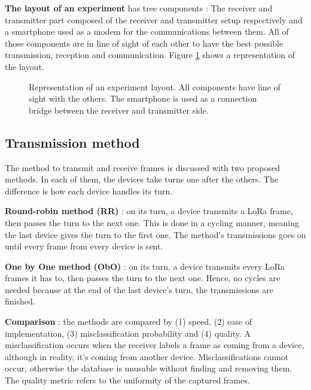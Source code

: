 \documentclass[a4paper, 12pt]{article}
\begin{document}
\textbf{The layout of an experiment} has tree components :
The receiver and transmitter part composed of the receiver and transmitter setup respectively and a smartphone used as a modem for the communications between them.
All of those components are in line of sight of each other to have the best possible transmission, reception and communication.
Figure \ref{fig:layout} shows a representation of the layout.


\begin{figure}[H]
  \begin{center}
    
  \end{center}
  \caption{Representation of an experiment layout. All components have line of sight with the others. The smartphone is used as a connection bridge between the receiver and transmitter side.}\label{fig:layout}
\end{figure}
\subsection{Transmission method}\label{tranMeth}

The method to transmit and receive frames is discussed with two proposed methods. In each of them, the devices take turns one after the others. The difference is how each device handles its turn.

\textbf{Round-robin method (RR)} : on its turn, a device transmits a LoRa frame, then passes the turn to the next one. This is done in a cycling manner, meaning the last device gives the turn to the first one.
The method's transmissions goes on until every frame from every device is sent.

\textbf{One by One method (ObO)} : on its turn, a device transmits every LoRa frames it has to, then passes the turn to the next one. Hence, no cycles are needed because at the end of the last device's turn, the transmissions are finished. 

\textbf{Comparison} : the methods are compared by (1) speed, (2) ease of implementation, (3) misclassification probability and (4) quality. A misclassification occurs when the receiver labels a frame as coming from a device, although in reality, it's coming from another device. Misclassifications cannot occur, otherwise the database is unusable without finding and removing them. The quality metric refers to the uniformity of the captured frames.  
\end{document}
